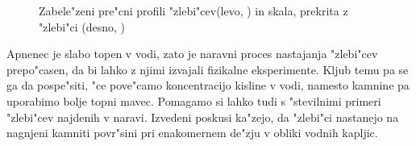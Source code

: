 \documentclass[a4paper,12pt]{article}
\begin{document}
\begin{figure}[h]
 \centering
 \caption{Zabele"zeni pre"cni profili "zlebi"cev(levo, \cite{gams}) in skala, prekrita z "zlebi"ci (desno, \cite{perne})}
\end{figure}


Apnenec je slabo topen v vodi, zato je naravni proces nastajanja "zlebi"cev prepo"casen, da bi lahko z njimi izvajali fizikalne eksperimente. Kljub temu pa se ga da pospe"siti, "ce pove"camo koncentracijo kisline v vodi, namesto kamnine pa uporabimo bolje topni mavec. Pomagamo si lahko tudi s "stevilnimi primeri "zlebi"cev najdenih v naravi. Izvedeni poskusi ka"zejo, da "zlebi"ci nastanejo na nagnjeni kamniti povr"sini pri enakomernem de"zju v obliki vodnih kapljic.
\end{document}

